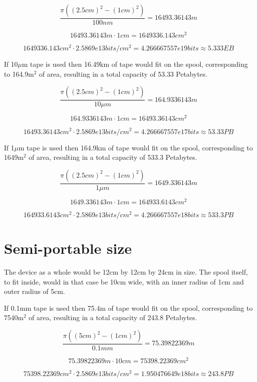 \documentclass[a4paper]{article}
\begin{document}
	$$ \frac{\pi ((2.5cm)^2 - (1cm)^2)}{100nm} =  16493.36143m$$
	
	$$ 16493.36143m \cdot 1cm =  1649336.143cm^2 $$
	
	$$ 1649336.143cm^2 \cdot 2.5869e13bits/cm^2 = 4.266667557e19 bits \approx 5.333EB $$
	
	\vfill
	
	
	If 10$\mu$m tape is used then 16.49km of tape would fit on the spool, corresponding to 164.9m$^2$ of area, resulting in a total capacity of 53.33 Petabytes.
	
	$$ \frac{\pi ((2.5cm)^2 - (1cm)^2)}{10\mu m} =  164.9336143m$$
	
	$$ 164.9336143m \cdot 1cm =  16493.36143cm^2 $$
	
	$$ 16493.36143cm^2 \cdot 2.5869e13bits/cm^2 = 4.266667557e17 bits \approx 53.33PB $$
	
	\vfill
	
	
	If 1$\mu$m tape is used then 164.9km of tape would fit on the spool, corresponding to 1649m$^2$ of area, resulting in a total capacity of 533.3 Petabytes.
	
	$$ \frac{\pi ((2.5cm)^2 - (1cm)^2)}{1\mu m} =  1649.336143m$$
	
	$$ 1649.336143m \cdot 1cm =  164933.6143cm^2 $$
	
	$$ 164933.6143cm^2 \cdot 2.5869e13bits/cm^2 = 4.266667557e18 bits \approx 533.3PB $$
	
	\pagebreak
	
	\section{Semi-portable size}
	
	The device as a whole would be 12cm by 12cm by 24cm in size. The spool itself, to fit inside, would in that case be 10cm wide, with an inner radius of 1cm and outer radius of 5cm.
	
	\vfill
	
	If 0.1mm tape is used then 75.4m of tape would fit on the spool, corresponding to 7540m$^2$ of area, resulting in a total capacity of 243.8 Petabytes.
	
	$$ \frac{\pi ((5cm)^2 - (1cm)^2)}{0.1mm} =  75.39822369 m$$
	
	$$ 75.39822369 m \cdot 10cm =  75398.22369 cm^2 $$
	
	$$ 75398.22369 cm^2 \cdot 2.5869e13bits/cm^2 =  1.950476649e18 bits \approx 243.8PB $$
	
	\vfill
	
\end{document}
